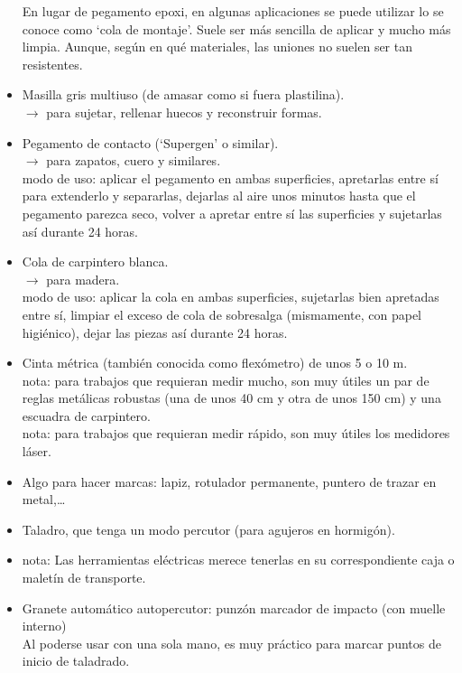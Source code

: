 \documentclass[spanish,10pt,a4paper,final,oneside]{article}
\begin{document}
\begin{itemize}
En lugar de pegamento epoxi, en algunas aplicaciones se puede utilizar lo se conoce como `cola de montaje'. Suele ser más sencilla de aplicar y mucho más limpia. Aunque, según en qué materiales, las uniones no suelen ser tan resistentes.

\item Masilla gris multiuso (de amasar como si fuera plastilina).
\\$\rightarrow$ para sujetar, rellenar huecos y reconstruir formas.

\item Pegamento de contacto (`Supergen' o similar).
\\$\rightarrow$ para zapatos, cuero y similares.
\\modo de uso: aplicar el pegamento en ambas superficies, apretarlas entre sí para extenderlo y separarlas, dejarlas al aire unos minutos hasta que el pegamento parezca seco, volver a apretar entre sí las superficies y sujetarlas así durante 24 horas.

\item Cola de carpintero blanca.
\\$\rightarrow$ para madera.
\\modo de uso: aplicar la cola en ambas superficies, sujetarlas bien apretadas entre sí, limpiar el exceso de cola de sobresalga (mismamente, con papel higiénico), dejar las piezas así durante 24 horas.

\item Cinta métrica (también conocida como flexómetro) de unos 5 o 10 m.
\\nota: para trabajos que requieran medir mucho, son muy útiles un par de reglas metálicas robustas (una de unos 40 cm y otra de unos 150 cm) y una escuadra de carpintero.
\\nota: para trabajos que requieran medir rápido, son muy útiles los medidores láser.

\item Algo para hacer marcas: lapiz, rotulador permanente, puntero de trazar en metal,\ldots

\item Taladro, que tenga un modo percutor (para agujeros en hormigón).
\item nota: Las herramientas eléctricas merece tenerlas en su correspondiente caja o maletín de transporte.

\item Granete automático autopercutor: punzón marcador de impacto (con muelle interno)
\\Al poderse usar con una sola mano, es muy práctico para marcar puntos de inicio de taladrado.


\end{itemize}
\end{document}
